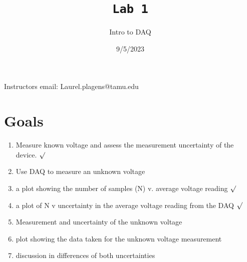 \documentclass[a4paper,12pt]{article}
\title{\texttt{Lab 1}\\\hrulefill}
\author{Intro to DAQ}
\date{\small{9/5/2023}}
\begin{document}
    \maketitle

    \begin{center}Instructors email: Laurel.plagens@tamu.edu\end{center}
    \section{Goals}
    \begin{enumerate}
      \item Measure known voltage and assess the measurement uncertainty of the device. $\surd$
      \item Use DAQ to measure an unknown voltage
      \item a plot showing the number of samples (N) v. average voltage reading $\surd$
      \item a plot of N v uncertainty in the average voltage reading from the DAQ $\surd$
      \item Measurement and uncertainty of the unknown voltage
      \item plot showing the data taken for the unknown voltage measurement
      \item discussion in differences of both uncertainties
    \end{enumerate}
\end{document}
